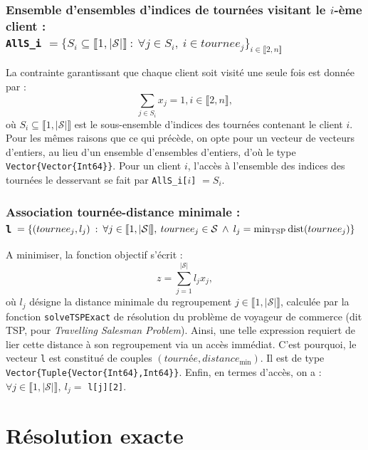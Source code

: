 \documentclass[french, 11pt, a4paper]{article} %
\newcommand{\Sc}{\mathcal{S}} %
\newcommand{\smb}{\smallbreak}
\begin{document}
\subsubsection{Ensemble d'ensembles d'indices de tournées visitant le $i$-ème client : \\ \texttt{AllS\_i} $= \{S_i \subseteq \llbracket 1, |\Sc| \rrbracket \: : \: \forall j \in S_i, \: i \in tournee_j\}_{i \in \llbracket 2 , n \rrbracket }$ }
La contrainte garantissant que chaque client soit visité une seule fois est donnée par :
\[ \sum_{j \in S_i} x_j = 1, i \in \llbracket 2,n \rrbracket, \]
où $S_i \subseteq \llbracket 1, |\Sc| \rrbracket$ est le sous-ensemble d'indices des tournées
contenant le client $i$.
Pour les mêmes raisons que ce qui précède, on opte pour un vecteur de vecteurs d'entiers, au lieu d'un ensemble d'ensembles d'entiers,
d'où le type \verb+Vector{Vector{Int64}}+.
\smb Pour un client $i$, l'accès à l'ensemble des indices des tournées le desservant se fait par \texttt{AllS\_i[}$i$\verb+]+ $=S_i$.

\subsubsection{Association tournée-distance minimale : \\ \texttt{l} 
$= \{(tournee_j,l_j) \: : \: \forall j \in \llbracket 1,|\Sc| \hspace{-0.15cm} \rrbracket,  \:
tournee_j \in \Sc 
\: \land \:
l_j = \min_{\text{\normalfont{TSP}}} \text{\normalfont{dist}}(tournee_j) \}$}

A minimiser, la fonction objectif s'écrit :
\[ z = \sum_{j=1}^{|\Sc|} l_j x_j,\]
où $l_j$ désigne la distance minimale du regroupement $j \in \llbracket 1,|\Sc| \rrbracket$, calculée par la
fonction \verb+solveTSPExact+ de résolution du problème de voyageur de commerce (dit TSP, pour \emph{Travelling Salesman Problem}).
Ainsi, une telle expression requiert de lier cette distance à son regroupement via un accès immédiat.
C'est pourquoi, le vecteur \verb+l+ est constitué de couples $(tourn \text{é} e,distance_{\text{min}})$.
Il est de type \verb+Vector{Tuple{Vector{Int64},Int64}}+.
\smb Enfin, en termes d'accès, on a : $\forall j \in \llbracket 1,|\Sc| \rrbracket, \: l_j = $ \texttt{l[j][2]}.


\section{Résolution exacte}
\end{document}
